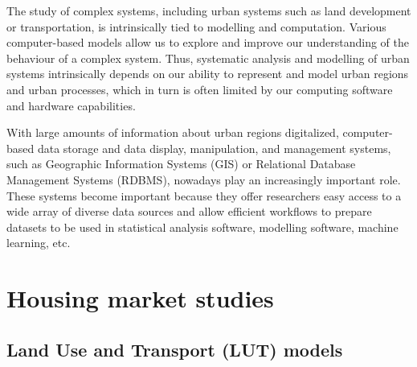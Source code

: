 The study of complex systems, including urban systems such as land development or transportation, is intrinsically tied to modelling and computation.
Various computer-based models allow us to explore and improve our understanding of the behaviour of a complex system.
Thus, systematic analysis and modelling of urban systems intrinsically depends on our ability to represent and model urban regions and urban processes, which in turn is often limited by our computing software and hardware capabilities.

With large amounts of information about urban regions digitalized\cite{TeranetEnterprisesInc.}, computer-based data storage and data display, manipulation, and management systems, such as Geographic Information Systems (GIS) or Relational Database Management Systems (RDBMS), nowadays play an increasingly important role.
These systems become important because they offer researchers easy access to a wide array of diverse data sources and allow efficient workflows to prepare datasets to be used in statistical analysis software, modelling software, machine learning, etc.

\section{Housing market studies} \label{sec:housing_market_studies}

\subsection{Land Use and Transport (LUT) models} \label{subsec:evolution_of_models_of_urban_systems}

